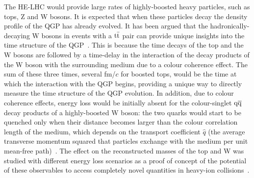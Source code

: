 \documentclass[../report.tex]{subfiles}
\begin{document}
The HE-LHC would provide large rates of highly-boosted heavy particles, such as tops, Z and W bosons. It is expected that when these particles decay the density profile of the QGP has already evolved. It has been argued that the hadronically-decaying W bosons in events with a $\rm t\bar t$ pair can provide unique insights into the time structure of the QGP~\cite{Apolinario:2017sob}. This is because the time decays of the top and the W bosons are followed by a time-delay in the interaction of the decay products of the W boson with the surrounding medium due to a colour coherence effect. The sum of these three times, several fm/$c$ for boosted tops, would be the time at which the interaction with the QGP begins, providing a unique way to directly measure the time structure of the QGP evolution.
In addition, due to colour coherence effects, energy loss  would be initially absent for the colour-singlet $\rm q\overline q$ decay products of a highly-boosted W boson: the two quarks would start to be quenched only when their distance becomes larger than the colour correlation length of the medium, which depends on the transport coefficient $\hat{q}$ (the average transverse momentum squared that particles exchange with the medium per unit mean-free path)~\cite{CasalderreySolana:2012ef}.
The effect on the reconstructed masses of the top and W was studied with different energy loss scenarios as a proof of concept of the potential of these observables to access completely novel quantities in heavy-ion collisions~\cite{Apolinario:2017sob}. 
\end{document}
